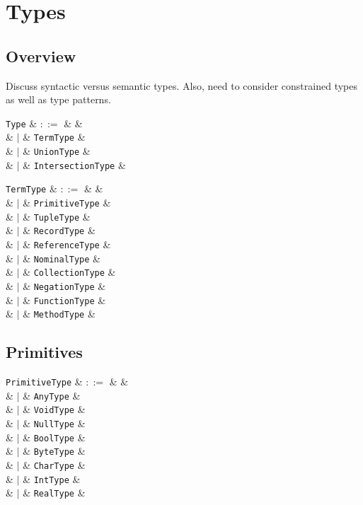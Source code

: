 \chapter{Types}
\section{Overview}
Discuss syntactic versus semantic types.  Also, need to consider
constrained types as well as type patterns.

\begin{syntax}
  \verb+Type+ & $::=$ & &\\
  & $|$ & \verb+TermType+ &\\
  & $|$ & \verb+UnionType+ &\\
  & $|$ & \verb+IntersectionType+ &\\
\end{syntax}

\begin{syntax}
  \verb+TermType+ & $::=$ & &\\
  & $|$ & \verb+PrimitiveType+ &\\
  & $|$ & \verb+TupleType+ &\\
  & $|$ & \verb+RecordType+ &\\
  & $|$ & \verb+ReferenceType+ &\\
  & $|$ & \verb+NominalType+ &\\
  & $|$ & \verb+CollectionType+ &\\
  & $|$ & \verb+NegationType+ &\\
  & $|$ & \verb+FunctionType+ &\\
  & $|$ & \verb+MethodType+ &\\
\end{syntax}


\section{Primitives}

\begin{syntax}
  \verb+PrimitiveType+ & $::=$ & &\\
  & $|$ & \verb+AnyType+ &\\
  & $|$ & \verb+VoidType+ &\\
  & $|$ & \verb+NullType+ &\\
  & $|$ & \verb+BoolType+ &\\
  & $|$ & \verb+ByteType+ &\\
  & $|$ & \verb+CharType+ &\\
  & $|$ & \verb+IntType+ &\\
  & $|$ & \verb+RealType+ &\\
\end{syntax}


